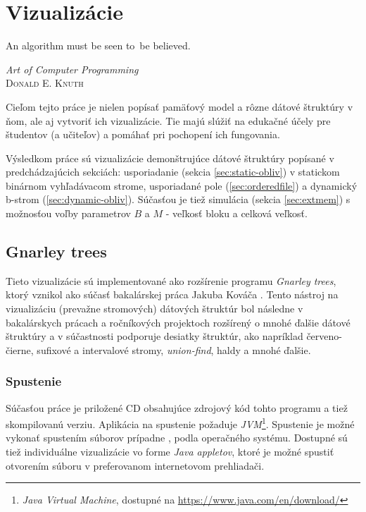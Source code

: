 \chapter{Vizualizácie}
\epigraph{An algorithm must be seen to~be believed.}{\textit{Art of Computer Programming}\\ \textsc{Donald E. Knuth}}

Cieľom tejto práce je nielen popísať \obliv pamäťový model a rôzne dátové štruktúry v ňom, ale aj vytvoriť ich vizualizácie. Tie majú slúžiť na edukačné účely pre študentov (a učiteľov) a pomáhať pri pochopení ich fungovania.

Výsledkom práce sú vizualizácie demonštrujúce dátové štruktúry popísané v predchádzajúcich sekciách: \vEB usporiadanie (sekcia \ref{sec:static-obliv}) v statickom binárnom vyhľadávacom strome, usporiadané pole (\ref{sec:orderedfile}) a dynamický b-strom (\ref{sec:dynamic-obliv}). Súčasťou je tiež simulácia \cache (sekcia \ref{sec:extmem}) s možnosťou voľby parametrov $B$ a $M$ - veľkosť bloku a celková veľkosť.


\section{Gnarley trees}
Tieto vizualizácie sú implementované ako rozšírenie programu \emph{Gnarley trees}, ktorý vznikol ako súčasť bakalárskej práca Jakuba Kováča \citep{algviskuko}. Tento nástroj na vizualizáciu (prevažne stromových) dátových štruktúr bol následne v bakalárskych prácach \citep{algviskotrlova, algvistomkovic, algvislukca} a ročníkových projektoch rozšírený o mnohé ďalšie dátové štruktúry a v súčastnosti podporuje desiatky štruktúr, ako napríklad červeno-čierne, sufixové a intervalové stromy, \emph{union-find}, haldy a mnohé ďalšie.

\subsection{Spustenie}
Súčasťou práce je priložené CD obsahujúce zdrojový kód tohto programu a tiež skompilovanú verziu. Aplikácia na spustenie požaduje \emph{JVM}\footnote{\emph{Java Virtual Machine}, dostupné na \url{https://www.java.com/en/download/}}. Spustenie je možné vykonať spustením súborov  prípadne , podla operačného systému. Dostupné sú tiež individuálne vizualizácie vo forme \emph{Java appletov}, ktoré je možné spustiť otvorením súboru  v preferovanom internetovom prehliadači.

